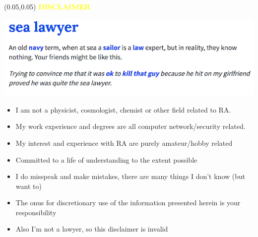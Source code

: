 \documentclass[aspectratio=169]{beamer} %
\begin{document}
\begin{frame}{}
    \setlength{\TPHorizModule}{\textwidth}
    \setlength{\TPVertModule}{\textwidth}
    \begin{textblock}{0.74}(0.05,0.05)
        \bfseries\huge\textcolor{yellow}{DISCLAIMER}
    \end{textblock}

    \begin{flushright}
    \includegraphics[width=0.65\linewidth, height=0.3\textheight]{../images/sea_lawyer.png}
    \end{flushright}

    \begin{itemize}
        \color{yellow}
        \item I am not a physicist, cosmologist, chemist or other field related to RA.
        \item My work experience and degrees are all computer network/security related.
        \item My interest and experience with RA are purely amateur/hobby related
        \item Committed to a life of understanding to the extent possible
        \item I do misspeak and make mistakes, there are many things I don’t know (but want to)
        \item The onus for discretionary use of the information presented herein is your responsibility
        \item Also I’m not a lawyer, so this disclaimer is invalid
    \end{itemize}


\end{frame}
\end{document}
